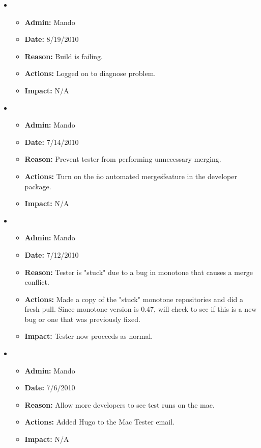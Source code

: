 \documentclass[12pt]{article}
\begin{document}
\begin{itemize}
\item 
\begin{itemize}
\item[] {\bf Admin:} Mando
\item[] {\bf Date:} 8/19/2010
\item[] {\bf Reason:} Build is failing. 
\item[] {\bf Actions:} Logged on to diagnose problem.
\item[] {\bf Impact:} N/A
\end{itemize}
	
\item 
\begin{itemize}
\item[] {\bf Admin:} Mando
\item[] {\bf Date:} 7/14/2010
\item[] {\bf Reason:} Prevent tester from performing unnecessary merging. 
\item[] {\bf Actions:} Turn on the \"no automated merges\" feature in the developer package.
\item[] {\bf Impact:} N/A
\end{itemize}

\item 
\begin{itemize}
\item[] {\bf Admin:} Mando
\item[] {\bf Date:} 7/12/2010
\item[] {\bf Reason:} Tester is "stuck" due to a bug in monotone that causes a merge conflict.
\item[] {\bf Actions:} Made a copy of the "stuck" monotone repositories and did a fresh pull. Since monotone version is 0.47, will check to see if this is a new bug or one that was previously fixed.
\item[] {\bf Impact:} Tester now proceeds as normal. 
\end{itemize}

\item 
\begin{itemize}
\item[] {\bf Admin:} Mando
\item[] {\bf Date:} 7/6/2010
\item[] {\bf Reason:} Allow more developers to see test runs on the mac.
\item[] {\bf Actions:} Added Hugo to the Mac Tester email.
\item[] {\bf Impact:} N/A
\end{itemize}
\end{itemize}
\end{document}
